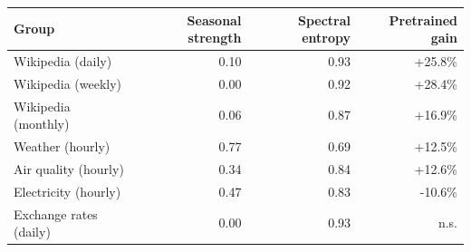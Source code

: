 \begin{tabular}{lrrr}
\toprule
Group & Seasonal strength & Spectral entropy & Pretrained gain \\
\midrule
Wikipedia (daily) & 0.10 & 0.93 & +25.8\% \\
Wikipedia (weekly) & 0.00 & 0.92 & +28.4\% \\
Wikipedia (monthly) & 0.06 & 0.87 & +16.9\% \\
Weather (hourly) & 0.77 & 0.69 & +12.5\% \\
Air quality (hourly) & 0.34 & 0.84 & +12.6\% \\
Electricity (hourly) & 0.47 & 0.83 & -10.6\% \\
Exchange rates (daily) & 0.00 & 0.93 & n.s. \\
\bottomrule
\end{tabular}
